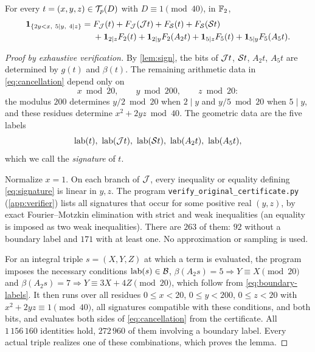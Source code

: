 \begin{lemma}\label{lem:cancellation}
For every $t=(x,y,z)\in\mathcal T_p(D)$ with $D\equiv1\pmod{40}$, in $\mathbb{F}_2$,
\begin{equation}\label{eq:cancellation}
\begin{aligned}
  \mathbf 1_{\{2y<x,\ 5\mid y,\ 4\mid z\}}={}&F_{\mathcal J}(t)+F_{\mathcal J}(\mathcal J t)+F_{\mathcal S}(t)+F_{\mathcal S}(\mathcal S t)\\
  &+\mathbf 1_{2\mid z}F_2(t)+\mathbf 1_{2\mid y}F_2(A_2t)+\mathbf 1_{5\mid z}F_5(t)+\mathbf 1_{5\mid y}F_5(A_5t).
\end{aligned}
\end{equation}
\end{lemma}

\begin{proof}[Proof by exhaustive verification]
By \cref{lem:sign}, the bits of $\mathcal J t$, $\mathcal S t$, $A_2t$, $A_5t$ are determined by
$g(t)$ and $\beta(t)$. The remaining arithmetic data in \eqref{eq:cancellation}
depend only on
\[
  x\bmod20,\qquad y\bmod200,\qquad z\bmod20 :
\]
the modulus $200$ determines $y/2\bmod20$ when $2\mid y$ and $y/5\bmod20$ when
$5\mid y$, and these residues determine $x^2+2yz\bmod40$. The geometric data are
the five labels
\begin{equation}\label{eq:signature}
  \lab(t),\ \lab(\Jk t),\ \lab(\Sw t),\ \lab(A_2t),\ \lab(A_5t),
\end{equation}
which we call the \emph{signature} of $t$.

Normalize $x=1$. On each branch of $\mathcal J$, every inequality or equality defining
\eqref{eq:signature} is linear in $y,z$. The program
\texttt{verify\_original\_certificate.py} (\cref{app:verifier}) lists all
signatures that occur for some positive real $(y,z)$, by exact
Fourier--Motzkin elimination with strict and weak inequalities (an equality is
imposed as two weak inequalities). There are $263$ of them: $92$ without a
boundary label and $171$ with at least one. No approximation or sampling is used.

For an integral triple $s=(X,Y,Z)$ at which a term is evaluated, the program
imposes the necessary conditions $\operatorname{lab}(s)\in\mathcal B$,
$\beta(A_2s)=5\Rightarrow Y\equiv X\pmod{20}$ and
$\beta(A_2s)=7\Rightarrow Y\equiv3X+4Z\pmod{20}$, which follow from
\eqref{eq:boundary-labels}. It then runs over all residues $0\le x<20$,
$0\le y<200$, $0\le z<20$ with $x^2+2yz\equiv1\pmod{40}$, all signatures compatible
with these conditions, and both bits, and evaluates both sides of
\eqref{eq:cancellation} from the certificate. All $1\,156\,160$ identities hold,
$272\,960$ of them involving a boundary label. Every actual triple realizes one
of these combinations, which proves the lemma.
\end{proof}

